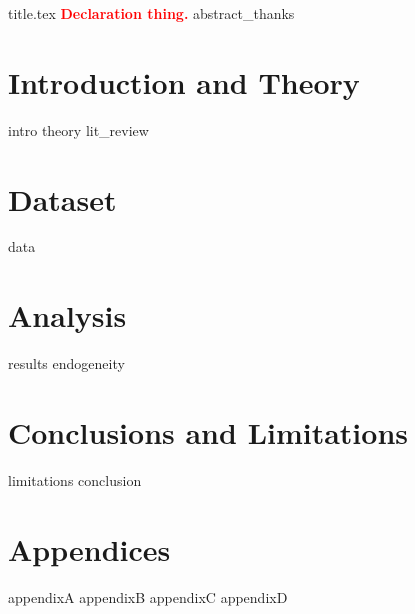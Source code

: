 \documentclass[openany,a4paper,12pt]{book}
\begin{document}
\pagestyle{headings}
\pagestyle{fancy}
\fancyfoot[R]{\thepage}

\frontmatter
{title.tex}
\clearpage
\textcolor{red}{\textbf{Declaration thing.}}
{abstract_thanks}
\tableofcontents

\newpage
\thispagestyle{empty}
\listoftables
\listoffigures



\mainmatter %

\chapter{Introduction and Theory} %
{intro} %
{theory} %
{lit_review} %


\chapter{Dataset} %
\label{sec:Dataset}
{data}

\chapter{Analysis} %
\label{sec:Analysis}
{results} %
{endogeneity} %

\chapter{Conclusions and Limitations} %
\label{sec:Limitations}
{limitations} %
{conclusion} %
\label{sec:Bibliography}

\label{sec:appendices}
\chapter{Appendices}
{appendixA}
\newpage
{appendixB}
\newpage
{appendixC}
\newpage
{appendixD}

\backmatter


\printglossary[type=\acronymtype, nonumberlist]
\end{document}
